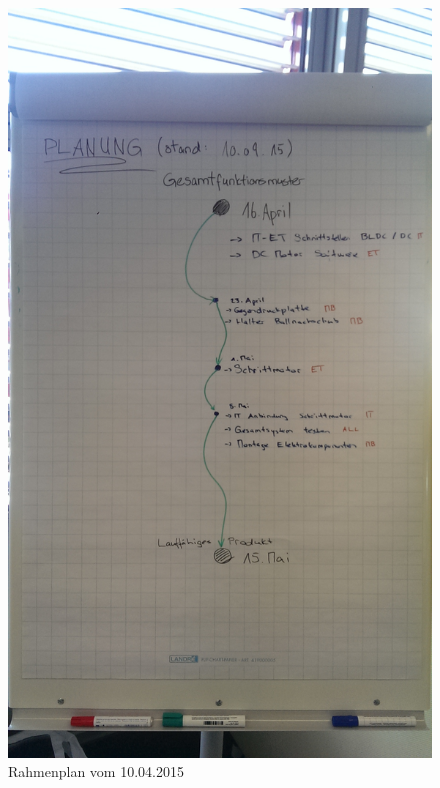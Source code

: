 \begin{figure}[h!]
	\centering
	\includegraphics[width=0.6\linewidth]{../../fig/rahmenplanung-10042015}
	\caption{Rahmenplan vom 10.04.2015}
	\label{fig:rahmenplanung-10042015}
\end{figure}


